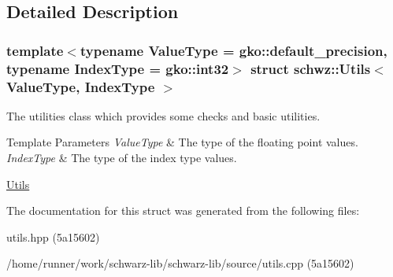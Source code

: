 \subsection{Detailed Description}
\subsubsection*{template$<$typename Value\+Type = gko\+::default\+\_\+precision, typename Index\+Type = gko\+::int32$>$\newline
struct schwz\+::\+Utils$<$ Value\+Type, Index\+Type $>$}

The utilities class which provides some checks and basic utilities. 


\begin{DoxyTemplParams}{Template Parameters}
{\em Value\+Type} & The type of the floating point values. \\
\hline
{\em Index\+Type} & The type of the index type values.\\
\hline
\end{DoxyTemplParams}
\hyperlink{group__utils}{Utils} 

The documentation for this struct was generated from the following files\+:\begin{DoxyCompactItemize}
\item 
utils.\+hpp (5a15602)\item 
/home/runner/work/schwarz-\/lib/schwarz-\/lib/source/utils.\+cpp (5a15602)\end{DoxyCompactItemize}

